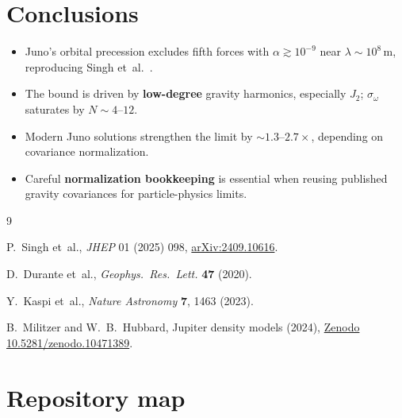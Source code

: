 \documentclass[11pt,a4paper]{article}
\begin{document}
\section{Conclusions}

\begin{itemize}
  \item Juno's orbital precession excludes fifth forces with
        \(\alpha\gtrsim 10^{-9}\) near \(\lambda\sim 10^{8}\,\mathrm{m}\),
        reproducing Singh et~al.~\cite{Singh2025}.
  \item The bound is driven by \textbf{low-degree} gravity harmonics,
        especially \(J_2\); \(\sigma_\omega\) saturates by \(N\sim 4\)--\(12\).
  \item Modern Juno solutions strengthen the limit by
        \(\sim 1.3\)--\(2.7\times\), depending on covariance normalization.
  \item Careful \textbf{normalization bookkeeping} is essential when reusing
        published gravity covariances for particle-physics limits.
\end{itemize}

\begin{thebibliography}{9}

  P.~Singh et~al.,
  \emph{JHEP} 01 (2025) 098,
  \href{https://arxiv.org/abs/2409.10616}{arXiv:2409.10616}.

  D.~Durante et~al.,
  \emph{Geophys.\ Res.\ Lett.} \textbf{47} (2020).

  Y.~Kaspi et~al.,
  \emph{Nature Astronomy} \textbf{7}, 1463 (2023).

  B.~Militzer and W.~B.~Hubbard,
  Jupiter density models (2024),
  \href{https://doi.org/10.5281/zenodo.10471389}{Zenodo 10.5281/zenodo.10471389}.

\end{thebibliography}

\appendix
\section{Repository map}
\end{document}
